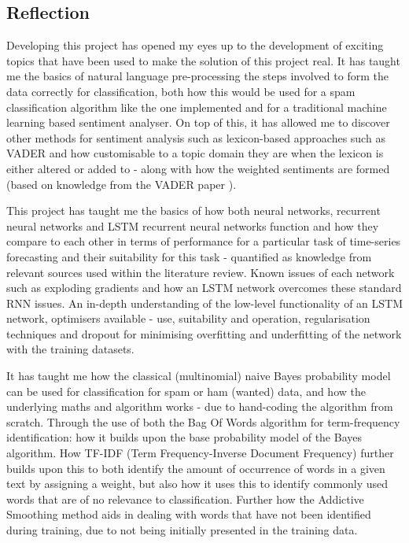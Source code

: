 \documentclass[oneside, 12pt]{article}
\begin{document}
	
	\subsection{Reflection}
	Developing this project has opened my eyes up to the development of exciting topics that have been used to make the solution of this project real. It has taught me the basics of natural language pre-processing the steps involved to form the data correctly for classification, both how this would be used for a spam classification algorithm like the one implemented and for a traditional machine learning based sentiment analyser. On top of this, it has allowed me to discover other methods for sentiment analysis such as lexicon-based approaches such as VADER and how customisable to a topic domain they are when the lexicon is either altered or added to - along with how the weighted sentiments are formed (based on knowledge from the VADER paper \cite{VADERPaper}). 
	
	This project has taught me the basics of how both neural networks, recurrent neural networks and LSTM recurrent neural networks function and how they compare to each other in terms of performance for a particular task of time-series forecasting and their suitability for this task - quantified as knowledge from relevant sources used within the literature review. Known issues of each network such as exploding gradients and how an LSTM network overcomes these standard RNN issues. An in-depth understanding of the low-level functionality of an LSTM network, optimisers available - use, suitability and operation, regularisation techniques and dropout for minimising overfitting and underfitting of the network with the training datasets.
	
	It has taught me how the classical (multinomial) naive Bayes probability model can be used for classification for spam or ham (wanted) data, and how the underlying maths and algorithm works - due to hand-coding the algorithm from scratch. Through the use of both the Bag Of Words algorithm for term-frequency identification: how it builds upon the base probability model of the Bayes algorithm. How TF-IDF (Term Frequency-Inverse Document Frequency) further builds upon this to both identify the amount of occurrence of words in a given text by assigning a weight, but also how it uses this to identify commonly used words that are of no relevance to classification. Further how the Addictive Smoothing method aids in dealing with words that have not been identified during training, due to not being initially presented in the training data.
	
\end{document}
